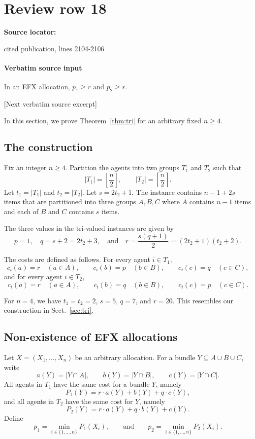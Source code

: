 \documentclass[10pt]{article}
\begin{document}
\section*{Review row 18}
\textbf{Source locator:} {\footnotesize\raggedright cited publication, lines 2104-\allowbreak{}2106\par}
\paragraph{Verbatim source input}
\begin{ReviewVerbatim}
\begin{proposition}
    In an EFX allocation, $p_1\ge r$ and $p_2\ge r$.
\end{proposition}

[Next verbatim source excerpt]

In this section, we prove Theorem~\ref{thm:tri} for an arbitrary fixed $n\geq 4$.

\subsection{The construction}
Fix an integer $n\ge 4$. Partition the agents into two groups $T_1$ and $T_2$ such that
\[
    |T_1|=\left\lfloor \frac n2\right\rfloor,
    \qquad
    |T_2|=\left\lceil \frac n2\right\rceil.
\]
Let $t_1=|T_1|$ and $t_2=|T_2|$.
Let $s=2t_2+1$.
The instance contains $n-1+2s$ items that are partitioned into three groups $A,B,C$ where $A$ contains $n-1$ items and each of $B$ and $C$ contains $s$ items.

The three values in the tri-valued instances are given by
$$p=1,\quad q=s+2=2t_2+3,\quad\mbox{and}\quad r=\frac{s(q+1)}2=(2t_2+1)(t_2+2).$$


The costs are defined as follows. For every agent $i\in T_1$,
\[
    c_i(a)=r \quad(a\in A),
    \qquad
    c_i(b)=p \quad(b\in B),
    \qquad
    c_i(c)=q \quad(c\in C),
\]
and for every agent $i\in T_2$,
\[
    c_i(a)=r \quad(a\in A),
    \qquad
    c_i(b)=q \quad(b\in B),
    \qquad
    c_i(c)=p \quad(c\in C).
\]

For $n=4$, we have $t_1=t_2=2$, $s=5$, $q=7$, and $r=20$.
This resembles our construction in Sect.~\ref{sec:tri}.

\subsection{Non-existence of EFX allocations}
Let $X=(X_1,\ldots,X_n)$ be an arbitrary allocation. For a bundle $Y\subseteq A\cup B\cup C$, write
\[
    a(Y)=|Y\cap A|,
    \qquad
    b(Y)=|Y\cap B|,
    \qquad
    c(Y)=|Y\cap C|.
\]
All agents in $T_1$ have the same cost for a bundle $Y$, namely
\[
    P_1(Y)=r\cdot a(Y)+b(Y)+q\cdot c(Y),
\]
and all agents in $T_2$ have the same cost for $Y$, namely
\[
    P_2(Y)=r\cdot  a(Y)+q\cdot b(Y)+c(Y).
\]
Define
\[
    p_1=\min_{i\in \{1,\ldots,n\}} P_1(X_i),
    \qquad\mbox{and}\qquad
    p_2=\min_{i\in \{1,\ldots,n\}} P_2(X_i).
\]
\end{ReviewVerbatim}
\end{document}
